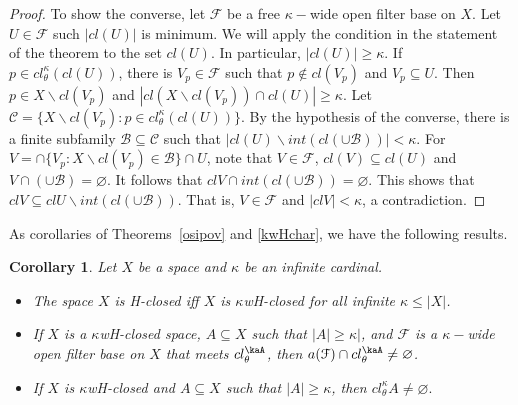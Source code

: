 \documentclass[11pt]{amsart}
\newtheorem{corollary}[theorem]{Corollary}
\theoremstyle{definition}
\theoremstyle{remark}
\numberwithin{equation}{section}
\begin{document}
\begin{proof}
To show the converse, let ${\ensuremath{\mathcal{{F}}}}$ be a free $\kappa-$wide open filter base on $X$.  Let $U \in{\ensuremath{\mathcal{{F}}}}$ such $|cl(U)|$ is minimum. We will apply the condition in the statement of the theorem to the set $cl(U)$. In particular, $|cl(U)| \geq \kappa$.  If $p \in cl_{\theta }^{\kappa}(cl(U)) $, there is $V_p \in {\ensuremath{\mathcal{{F}}}}$ such that $p \not\in cl(V_p)$ and $V_p \subseteq U$.  Then $p \in X\backslash cl(V_p)$ and $|cl(X\backslash cl(V_p)) \cap cl(U)| \geq \kappa$. Let ${\ensuremath{\mathcal{{C}}}}=\{X\backslash cl(V_p): p \in cl_{\theta }^{\kappa}(cl(U))\}$.  By the hypothesis of the converse, there is a finite subfamily ${\ensuremath{\mathcal{{B}}}}\subseteq{\ensuremath{\mathcal{{C}}}}$ such that $|cl(U)\backslash int(cl(\cup{\ensuremath{\mathcal{{B}}}}))| < \kappa$.  For $V = \cap\{V_p: X\backslash cl(V_p) \in{\ensuremath{\mathcal{{B}}}}\} \cap U$, note that $V \in {\ensuremath{\mathcal{F}}}$,  $cl(V) \subseteq cl(U)$ and $V \cap (\cup{\ensuremath{\mathcal{{B}}}}) = \varnothing$. It follows that $clV \cap int(cl(\cup{\ensuremath{\mathcal{{B}}}})) = \varnothing$.  This shows that $clV \subseteq clU \backslash int(cl(\cup{\ensuremath{\mathcal{{B}}}}))$. That is, $V \in {\ensuremath{\mathcal{{F}}}}$ and $|clV| < \kappa$, a contradiction. 
\end{proof}

As corollaries of Theorems~\ref{osipov} and \ref{kwHchar}, we have the following results.

\begin{corollary} Let $X$ be a space and $\kappa$ be an infinite cardinal. 
\begin{itemize}
\item[(a)] The space $X$ is H-closed iff $X$ is $\kappa$wH-closed for all infinite $\kappa \leq |X|$.
\item[(b)] If  $X$  is 
a $\kappa$wH-closed space, $A \subseteq X$ such that $|A| \geq \kappa|$, and ${\ensuremath{\mathcal{{F}}}}$ is a $\kappa-$wide open filter base on $X$ that meets  $cl_{\theta }^\kaA $, then  $a({\ensuremath{\mathcal{{F}}}}) \cap cl_{\theta }^\kaA \ne \varnothing$.
\item[(c)] If $X$ is $\kappa$wH-closed and $A \subseteq X$ such that $|A| \geq \kappa$, then $cl^{\kappa}_{\theta}A \ne \varnothing.$
\end{itemize}
\end{corollary}
\end{document}

